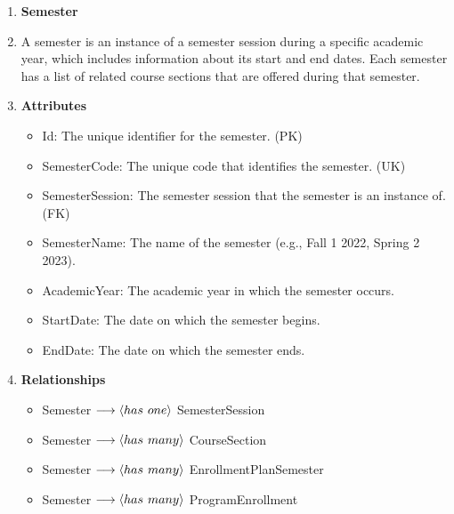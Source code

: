 \documentclass[12pt]{article}
\begin{document}
\begin{appendices}
\begin{enumerate}[label=(\roman*)]
    \item \textbf{Semester}
    \item[] A semester is an instance of a semester session during a specific academic year, which includes information about its start and end dates. Each semester has a list of related course sections that are offered during that semester.
    \item[] \textbf{Attributes}
    \begin{itemize}
        \item Id: The unique identifier for the semester. (PK)
        \item SemesterCode: The unique code that identifies the semester. (UK)
        \item SemesterSession: The semester session that the semester is an instance of. (FK)
        \item SemesterName: The name of the semester (e.g., Fall 1 2022, Spring 2 2023).
        \item AcademicYear: The academic year in which the semester occurs.
        \item StartDate: The date on which the semester begins.
        \item EndDate: The date on which the semester ends.
    \end{itemize}
    \item[] \textbf{Relationships}
    \begin{itemize}
        \item Semester $ \longrightarrow \langle has \hspace{0.125cm} one \rangle $ SemesterSession
        \item Semester $ \longrightarrow \langle has \hspace{0.125cm} many \rangle $ CourseSection
        \item Semester $ \longrightarrow \langle has \hspace{0.125cm} many \rangle $ EnrollmentPlanSemester
        \item Semester $ \longrightarrow \langle has \hspace{0.125cm} many \rangle $ ProgramEnrollment
    \end{itemize}


\end{enumerate}
\end{appendices}
\end{document}
